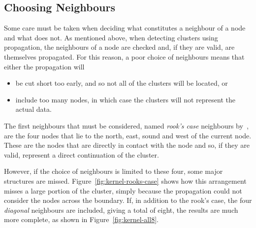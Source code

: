 \subsection{Choosing Neighbours}
\label{sub:choosing_neighbours}

Some care must be taken when deciding what constitutes a neighbour of a node
and what does not. As mentioned above, when detecting clusters using
propagation, the neighbours of a node are checked and, if they are valid, are
themselves propagated. For this reason, a poor choice of neighbours means that
either the propagation will
\begin{itemize}
	\item be cut short too early, and so not all of the clusters will be
		located, or
	\item include too many nodes, in which case the clusters will not represent
		the actual data.
\end{itemize}

The first neighbours that must be considered, named \emph{rook's case}
neighbours by~\cite{abel1990comparative}, are the four nodes that lie to the
north, east, sound and west of the current node. These are the nodes that are
directly in contact with the node and so, if they are valid, represent a direct
continuation of the cluster.

However, if the choice of neighbours is limited to these four, some major
structures are missed. Figure~\ref{fig:kernel-rooks-case} shows how this
arrangement misses a large portion of the cluster, simply because the
propagation could not consider the nodes across the boundary. If, in addition
to the rook's case, the four \emph{diagonal} neighbours are included, giving a
total of eight, the results are much more complete, as shown in
Figure~\ref{fig:kernel-all8}.


